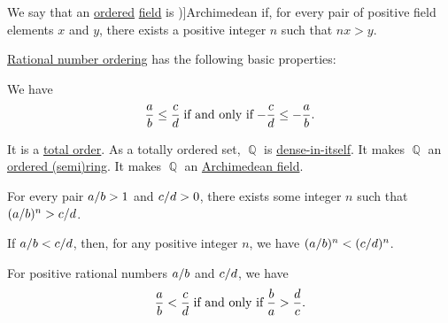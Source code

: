 \begin{definition}\label{def:archimedean_field}
  We say that an \hyperref[def:ordered_semiring]{ordered} \hyperref[def:field]{field} is \term[ru=архимедово кольцо (поле) (\cite[30]{Вечтомов2000})]{Archimedean} if, for every pair of positive field elements \( x \) and \( y \), there exists a positive integer \( n \) such that \( nx > y \).
\end{definition}

\begin{proposition}\label{thm:def:rational_number_ordering}
  \hyperref[def:rational_number_ordering]{Rational number ordering} has the following basic properties:
  \begin{thmenum}
     We have
    \begin{equation*}
      \frac a b \leq \frac c d \T{if and only if} -\frac c d \leq -\frac a b.
    \end{equation*}

     It is a \hyperref[def:totally_ordered_set]{total order}.
     As a totally ordered set, \( \BbbQ \) is \hyperref[def:dense_total_order]{dense-in-itself}.
     It makes \( \BbbQ \) an \hyperref[def:ordered_semiring]{ordered (semi)ring}.
     It makes \( \BbbQ \) an \hyperref[def:archimedean_field]{Archimedean field}.

     For every pair \( \ifrac a b > 1 \) and \( \ifrac c d > 0 \), there exists some integer \( n \) such that \( (\ifrac a b)^n > \ifrac c d \).

     If \( \ifrac a b < \ifrac c d \), then, for any positive integer \( n \), we have \( (\ifrac a b)^n < (\ifrac c d)^n \).

     For positive rational numbers \( \ifrac a b \) and \( \ifrac c d \), we have
    \begin{equation}\label{eq:thm:def:rational_number_ordering/reciprocal}
      \frac a b < \frac c d \T{if and only if} \frac b a > \frac d c.
    \end{equation}
  \end{thmenum}
\end{proposition}
